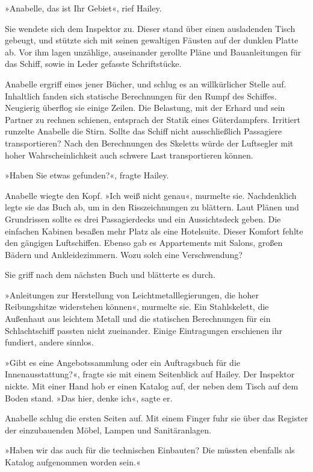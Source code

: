 »Anabelle, das ist Ihr Gebiet«, rief Hailey.

Sie wendete sich dem Inspektor zu. Dieser stand über einen
ausladenden Tisch gebeugt, und stützte sich mit seinen gewaltigen
Fäusten auf der dunklen Platte ab. Vor ihm lagen unzählige,
auseinander gerollte Pläne und Bauanleitungen für das Schiff, sowie
in Leder gefasste Schriftstücke.

Anabelle ergriff eines jener Bücher, und schlug es an willkürlicher
Stelle auf. Inhaltlich fanden sich statische Berechnungen für den
Rumpf des Schiffes. Neugierig überflog sie einige Zeilen. Die
Belastung, mit der Erhard und sein Partner zu rechnen schienen,
entsprach der Statik eines Güterdampfers. Irritiert runzelte
Anabelle die Stirn. Sollte das Schiff nicht ausschließlich
Passagiere transportieren? Nach den Berechnungen des Skeletts würde
der Luftsegler mit hoher Wahrscheinlichkeit auch schwere Last
transportieren können.

»Haben Sie etwas gefunden?«, fragte Hailey.

Anabelle wiegte den Kopf. »Ich weiß nicht genau«, murmelte sie.
Nachdenklich legte sie das Buch ab, um in den Risszeichnungen zu
blättern. Laut Plänen und Grundrissen sollte es drei Passagierdecks
und ein Aussichtsdeck geben. Die einfachen Kabinen besaßen mehr
Platz als eine Hotelsuite. Dieser Komfort fehlte den gängigen
Luftschiffen. Ebenso gab es Appartements mit Salons, großen Bädern
und Ankleidezimmern. Wozu solch eine Verschwendung?

Sie griff nach dem nächsten Buch und blätterte es durch.

»Anleitungen zur Herstellung von Leichtmetalllegierungen, die hoher
Reibungshitze widerstehen können«, murmelte sie. Ein Stahlskelett,
die Außenhaut aus leichtem Metall und die statischen Berechnungen
für ein Schlachtschiff passten nicht zueinander. Einige
Eintragungen erschienen ihr fundiert, andere sinnlos.

»Gibt es eine Angebotssammlung oder ein Auftragsbuch für die
Innenausstattung?«, fragte sie mit einem Seitenblick auf Hailey.
Der Inspektor nickte. Mit einer Hand hob er einen Katalog auf, der
neben dem Tisch auf dem Boden stand. »Das hier, denke ich«, sagte
er.

Anabelle schlug die ersten Seiten auf. Mit einem Finger fuhr sie
über das Register der einzubauenden Möbel, Lampen und
Sanitäranlagen.

»Haben wir das auch für die technischen Einbauten? Die müssten
ebenfalls als Katalog aufgenommen worden sein.«

